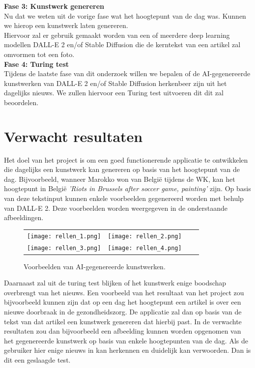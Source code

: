 \noindent
\textbf{Fase 3: Kunstwerk genereren} \\
Nu dat we weten uit de vorige fase wat het hoogtepunt van de dag was. Kunnen we hierop een kunstwerk laten genereren. \\
Hiervoor zal er gebruik gemaakt worden van een of meerdere deep learning modellen DALL-E 2 en/of Stable Diffusion die de kerntekst van een artikel zal omvormen tot een foto. \\

\noindent
\textbf{Fase 4: Turing test} \\ 
Tijdens de laatste fase van dit onderzoek willen we bepalen of de AI-gegenereerde kunstwerken van DALL-E 2 en/of Stable Diffusion herkenbeer zijn uit het dagelijks nieuws. We zullen hiervoor een Turing test uitvoeren dit dit zal beoordelen.
\section{Verwacht resultaten}%
\label{sec:verwachte_resultaten}
Het doel van het project is om een goed functionerende applicatie te ontwikkelen die dagelijks een kunstwerk kan genereren op basis van het hoogtepunt van de dag. Bijvoorbeeld, wanneer Marokko won van België tijdens de WK, kan het hoogtepunt in België \emph{'Riots in Brussels after soccer game, painting'} zijn. Op basis van deze tekstinput kunnen enkele voorbeelden gegenereerd worden met behulp van DALL-E 2. Deze voorbeelden worden weergegeven in de onderstaande afbeeldingen.


\begin{figure}[h!]
    \centering
    \begin{tabular}{llll}
        \texttt{[image: rellen\_1.png]} &
        \texttt{[image: rellen\_2.png]} \\
        \texttt{[image: rellen\_3.png]} &
        \texttt{[image: rellen\_4.png]}
    \end{tabular}
    \caption{Voorbeelden van AI-gegenereerde kunstwerken.}
    \label{fig:examples}
\end{figure}
\noindent
Daarnaast zal uit de turing test blijken of het kunstwerk enige boodschap overbrengt van het nieuws.
\noindent
Een voorbeeld van het resultaat van het project zou bijvoorbeeld kunnen zijn dat op een dag het hoogtepunt een artikel is over een nieuwe doorbraak in de gezondheidszorg. De applicatie zal dan op basis van de tekst van dat artikel een kunstwerk genereren dat hierbij past. In de verwachte resultaten zou dan bijvoorbeeld een afbeelding kunnen worden opgenomen van het gegenereerde kunstwerk op basis van enkele hoogtepunten van de dag. Als de gebruiker hier enige nieuws in kan herkennen en duidelijk kan verwoorden. Dan is dit een geslaagde test. 

